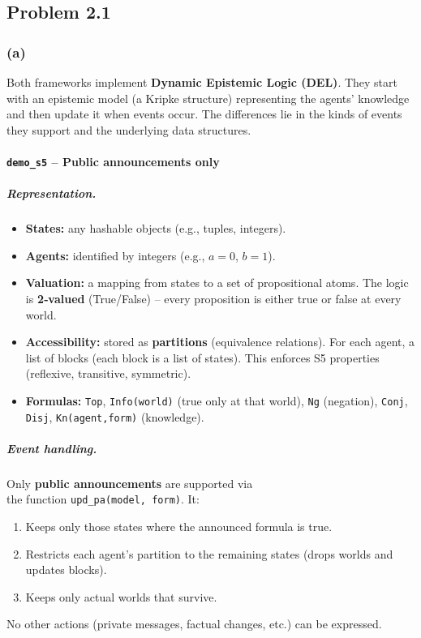 \subsection*{Problem 2.1}

\subsubsection*{(a)}

Both frameworks implement \textbf{Dynamic Epistemic Logic (DEL)}. 
They start with an epistemic model (a Kripke structure) 
representing the agents’ knowledge and then update it when events occur. 
The differences lie in the kinds of events they support and the 
underlying data structures.

\paragraph*{\texttt{demo\_s5} – Public announcements only}

\subparagraph*{Representation.}
\begin{itemize}
    \item \textbf{States:} any hashable objects (e.g., tuples, integers).
    \item \textbf{Agents:} identified by integers (e.g., $a=0$, $b=1$).
    \item \textbf{Valuation:} a mapping from states to a set 
    of propositional atoms. The logic is \textbf{2‑valued} 
    (True/False) – every proposition is either true or false at every world.
    \item \textbf{Accessibility:} stored as \textbf{partitions} 
    (equivalence relations). For each agent, a list of blocks 
    (each block is a list of states). 
    This enforces S5 properties (reflexive, transitive, symmetric).
    \item \textbf{Formulas:} \texttt{Top}, \texttt{Info(world)} 
    (true only at that world), \texttt{Ng} (negation), 
    \texttt{Conj}, \texttt{Disj}, \texttt{Kn(agent,form)} (knowledge).
\end{itemize}

\subparagraph*{Event handling.}
Only \textbf{public announcements} are supported via \\ 
the function \texttt{upd\_pa(model, form)}. It:
\begin{enumerate}
    \item Keeps only those states where 
    the announced formula is true.
    \item Restricts each agent’s partition to the remaining 
    states (drops worlds and updates blocks).
    \item Keeps only actual worlds that survive.
\end{enumerate}
No other actions (private messages, factual changes, etc.) 
can be expressed.

